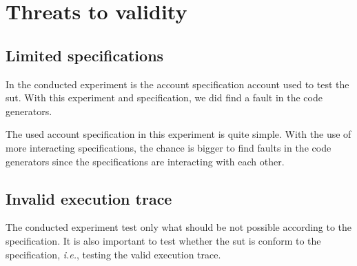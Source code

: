 \section{Threats to validity}

\subsection*{Limited specifications}
In the conducted experiment is the account specification account used
to test the \gls{sut}. With this experiment and specification,
we did find a fault in the code generators.

The used account specification in this experiment is quite simple. With the use
of more interacting specifications, the chance is bigger to find faults in the code
generators since the specifications are interacting with each other.

\subsection*{Invalid execution trace}
The conducted experiment test only what should be not possible according to the
specification. It is also important to test whether the \gls{sut} is conform to the
specification, \textit{i.e.}, testing the valid execution trace.
